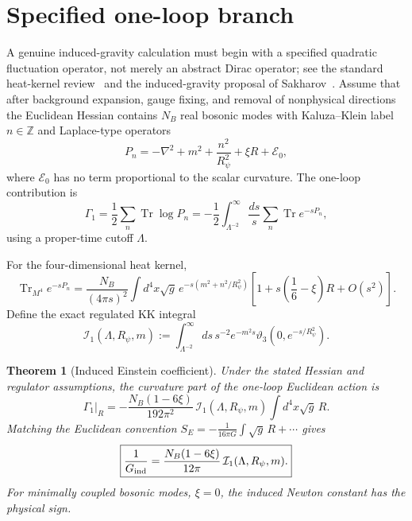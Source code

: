 \documentclass[11pt,a4paper]{article}
\newtheorem{theorem}{Theorem}
\newcommand{\Tr}{\operatorname{Tr}}
\begin{document}
\section{Specified one-loop branch}
A genuine induced-gravity calculation must begin with a specified quadratic
fluctuation operator, not merely an abstract Dirac operator; see the standard
heat-kernel review~\cite{vassilevich2003} and the induced-gravity proposal of
Sakharov~\cite{sakharov1967}.  Assume that after
background expansion, gauge fixing, and removal of nonphysical directions the
Euclidean Hessian contains $N_B$ real bosonic modes with Kaluza--Klein label
$n\in\mathbb Z$ and Laplace-type operators
\begin{equation}
 P_n=-\nabla^2+m^2+\frac{n^2}{R_\psi^2}+\xi R+\mathcal E_0,
 \label{eq:Pn}
\end{equation}
where $\mathcal E_0$ has no term proportional to the scalar curvature.  The
one-loop contribution is
\begin{equation}
 \Gamma_1=\frac12\sum_n\Tr\log P_n
 =-\frac12\int_{\Lambda^{-2}}^\infty\frac{ds}{s}
 \sum_n\Tr e^{-sP_n},
 \label{eq:proper}
\end{equation}
using a proper-time cutoff $\Lambda$.

For the four-dimensional heat kernel,
\begin{equation}
 \Tr_{M^4}e^{-sP_n}
 =\frac{N_B}{(4\pi s)^2}\int d^4x\sqrt g\,
 e^{-s(m^2+n^2/R_\psi^2)}
 \left[1+s\left(\frac16-\xi\right)R+O(s^2)\right].
 \label{eq:hk}
\end{equation}
Define the exact regulated KK integral
\begin{equation}
 \mathcal I_1(\Lambda,R_\psi,m)
 :=\int_{\Lambda^{-2}}^\infty ds\,s^{-2}e^{-m^2s}
 \vartheta_3\!\left(0,e^{-s/R_\psi^2}\right).
 \label{eq:I1}
\end{equation}

\begin{theorem}[Induced Einstein coefficient]\label{thm:induced}
Under the stated Hessian and regulator assumptions, the curvature part of the
one-loop Euclidean action is
\begin{equation}
 \boxed{
 \Gamma_1\big|_R
 =-\frac{N_B(1-6\xi)}{192\pi^2}\,
 \mathcal I_1(\Lambda,R_\psi,m)
 \int d^4x\sqrt g\,R.}
 \label{eq:GammaR}
\end{equation}
Matching the Euclidean convention
$S_E=-\frac1{16\pi G}\int\sqrt g\,R+\cdots$ gives
\begin{equation}
 \boxed{
 \frac1{G_{\rm ind}}
 =\frac{N_B(1-6\xi)}{12\pi}\,
 \mathcal I_1(\Lambda,R_\psi,m).}
 \label{eq:Gind}
\end{equation}
For minimally coupled bosonic modes, $\xi=0$, the induced Newton constant has
the physical sign.
\end{theorem}
\end{document}

